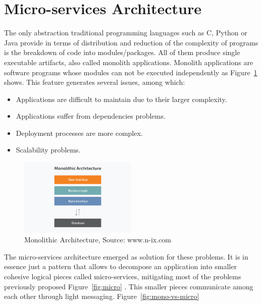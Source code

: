 \section{Micro-services Architecture}
\label{Micro-services Architecture}

The only abstraction traditional programming languages such as C, Python or Java provide in terms of distribution and reduction of the complexity of programs is the breakdown of code into modules/packages. All of them produce single executable artifacts, also called monolith applications. Monolith applications are software programs whose modules can not be executed independently as Figure~\ref{fig:mono-app} shows. This feature generates several issues, among which:

\begin{itemize}
    \item Applications are difficult to maintain due to their larger complexity.
    \item Applications suffer from dependencies problems.
    \item Deployment processes are more complex.
    \item Scalability problems.
\end{itemize}

\begin{figure}[H]
    \centering
    \caption{\label{fig:mono-app}Monolithic Architecture, Source: www.n-ix.com~\cite{monoVsMicro}}
    \includegraphics[width=0.5\textwidth]{figures/mono.jpg}
\end{figure}

\newpage
The micro-services architecture emerged as solution for these problems. It is in essence just a pattern that allows to decompose an application into smaller cohesive logical pieces called micro-services, mitigating most of the problems previously proposed Figure~\ref{fig:micro} . This smaller pieces communicate among each other through light messaging. Figure~\ref{fig:mono-vs-micro}

